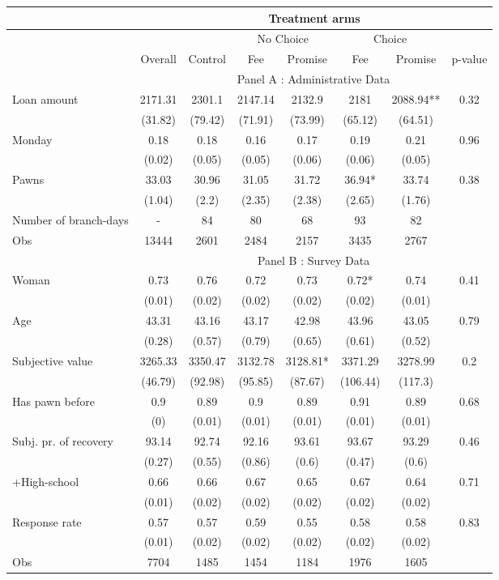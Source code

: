 \begin{tabular}{lccccccc}
\toprule
      &       & \multicolumn{5}{c}{Treatment arms}    &  \\
\midrule
      &       &       & \multicolumn{2}{c}{No Choice } & \multicolumn{2}{c}{Choice} &  \\
\midrule
\midrule
      & Overall & Control & Fee   & Promise & Fee   & Promise & p-value \\
\midrule
      & \multicolumn{7}{c}{Panel A : Administrative Data} \\
\midrule
\midrule
Loan amount  & 2171.31 & 2301.1 & 2147.14 & 2132.9 & 2181  & 2088.94** & 0.32 \\
      & (31.82) & (79.42) & (71.91) & (73.99) & (65.12) & (64.51) &  \\
Monday & 0.18  & 0.18  & 0.16  & 0.17  & 0.19  & 0.21  & 0.96 \\
      & (0.02) & (0.05) & (0.05) & (0.06) & (0.06) & (0.05) &  \\
Pawns & 33.03 & 30.96 & 31.05 & 31.72 & 36.94* & 33.74 & 0.38 \\
      & (1.04) & (2.2) & (2.35) & (2.38) & (2.65) & (1.76) &  \\
\midrule
Number of branch-days & -     & 84    & 80    & 68    & 93    & 82    &  \\
Obs   & 13444 & 2601  & 2484  & 2157  & 3435  & 2767  &  \\
\midrule
      & \multicolumn{7}{c}{Panel B : Survey Data} \\
\midrule
\midrule
Woman & 0.73  & 0.76  & 0.72  & 0.73  & 0.72* & 0.74  & 0.41 \\
      & (0.01) & (0.02) & (0.02) & (0.02) & (0.02) & (0.01) &  \\
Age   & 43.31 & 43.16 & 43.17 & 42.98 & 43.96 & 43.05 & 0.79 \\
      & (0.28) & (0.57) & (0.79) & (0.65) & (0.61) & (0.52) &  \\
Subjective value & 3265.33 & 3350.47 & 3132.78 & 3128.81* & 3371.29 & 3278.99 & 0.2 \\
      & (46.79) & (92.98) & (95.85) & (87.67) & (106.44) & (117.3) &  \\
Has pawn before & 0.9   & 0.89  & 0.9   & 0.89  & 0.91  & 0.89  & 0.68 \\
      & (0)   & (0.01) & (0.01) & (0.01) & (0.01) & (0.01) &  \\
Subj. pr. of recovery & 93.14 & 92.74 & 92.16 & 93.61 & 93.67 & 93.29 & 0.46 \\
      & (0.27) & (0.55) & (0.86) & (0.6) & (0.47) & (0.6) &  \\
+High-school & 0.66  & 0.66  & 0.67  & 0.65  & 0.67  & 0.64  & 0.71 \\
      & (0.01) & (0.02) & (0.02) & (0.02) & (0.02) & (0.02) &  \\
Response rate & 0.57  & 0.57  & 0.59  & 0.55  & 0.58  & 0.58  & 0.83 \\
      & (0.01) & (0.02) & (0.02) & (0.02) & (0.02) & (0.02) &  \\
\midrule
Obs   & 7704  & 1485  & 1454  & 1184  & 1976  & 1605  &  \\
\bottomrule
\bottomrule
\end{tabular}%
